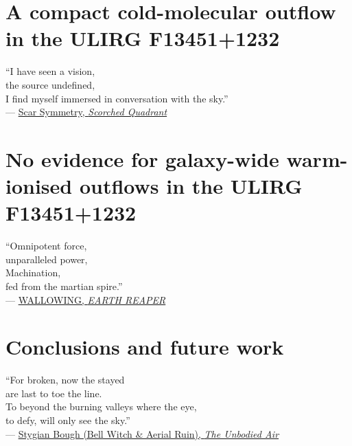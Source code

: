 \documentclass[12pt, twoside, openright]{report}
\begin{document}
\chapter{A compact cold-molecular outflow in the ULIRG F13451+1232}
\label{chapter: alma_f13451_1232}

\vspace*{2cm}
\vbox{\large``I have seen a vision,\\
the source undefined,\\
I find myself immersed in conversation with the sky.''\\

--- \href{https://www.scarsymmetryofficial.com/}{Scar Symmetry, \textit{Scorched Quadrant}}}
\newpage
\noindent
\newpage
\noindent



\chapter{No evidence for galaxy-wide warm-ionised outflows in the ULIRG F13451+1232}
\label{chapter: muse_f13451_1232}

\vspace*{2cm}
\vbox{\large``Omnipotent force,\\
unparalleled power,\\

\noindent
Machination,\\
fed from the martian spire.''\\

--- \href{https://wallowingnoise.bandcamp.com/album/earth-reaper}{WALLOWING, \textit{EARTH REAPER}}}
\newpage
\noindent



\chapter{Conclusions and future work}
\label{chapter: conclusions_and_future_work}

\vspace*{2cm}
\vbox{\large``For broken, now the stayed\\
are last to toe the line.\\
To beyond the burning valleys where the eye,\\
to defy, will only see the sky.''\\

--- \href{https://bellwitch.bandcamp.com/album/stygian-bough-volume-i}{Stygian Bough (Bell Witch \& Aerial Ruin), \textit{The Unbodied Air}}}
\end{document}
